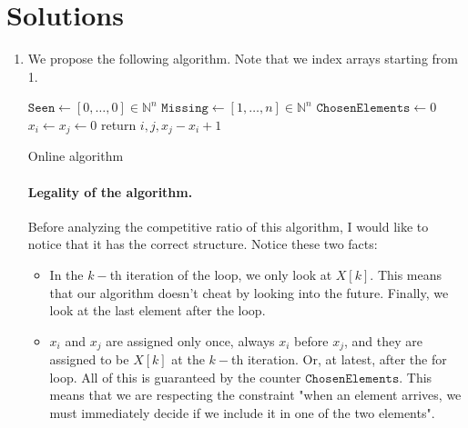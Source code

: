 \documentclass[11pt]{article}
\begin{document}
\section*{Solutions}
\begin{enumerate}
    \item We propose the following algorithm. Note that we index arrays starting from 1.
    \begin{algorithm}[!ht]
        \DontPrintSemicolon
        $\mathtt{Seen} \gets [0,\dots,0] \in \mathbb{N}^n$\;
        $\mathtt{Missing} \gets [1,\dots,n] \in \mathbb{N}^n$\;
        $\mathtt{ChosenElements} \gets 0$\;
        $x_i \gets x_j \gets 0$\;
        return $i,j,x_j - x_i + 1$\;
        \caption{Online algorithm}\label{a}
        \end{algorithm}
        \paragraph*{Legality of the algorithm.}
        Before analyzing the competitive ratio of this algorithm, I would like to notice that it has the correct structure. Notice these two facts:
        \begin{itemize}
            \item In the $k-$th iteration of the loop, we only look at $X[k]$. This means that our algorithm doesn't cheat by looking into the future. Finally, we look at the last element after the loop.
            \item $x_i$ and $x_j$ are assigned only once, always $x_i$ before $x_j$, and they are assigned to be $X[k]$ at the $k-$th iteration. Or, at latest, after the for loop. All of this is guaranteed by the counter $\mathtt{ChosenElements}$. This means that we are respecting the constraint "when an element arrives, we must immediately decide if we include it in one of the two elements".
        \end{itemize}

\end{enumerate}
\end{document}
